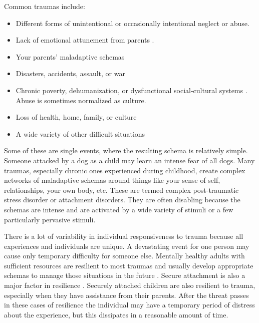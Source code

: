 \documentclass[12pt,letterpaper]{book}
\begin{document}
Common traumas include:
\begin{itemize}
    \item Different forms of unintentional or occasionally intentional neglect or abuse.
    \item Lack of emotional attunement from parents \cite{brownAttachmentDisturbances}.
    \item Your parents' maladaptive schemas
    \item Disasters, accidents, assault, or war
    \item Chronic poverty, dehumanization, or dysfunctional social-cultural systems \cite{roncaStructuralViolence}. Abuse is sometimes normalized as culture.
    \item Loss of health, home, family, or culture
    \item A wide variety of other difficult situations
\end{itemize}
Some of these are single events, where the resulting schema is relatively simple. Someone attacked by a dog as a child may learn an intense fear of all dogs. Many traumas, especially chronic ones experienced during childhood, create complex networks of maladaptive schemas around things like your sense of self, relationships, your own body, etc. These are termed complex post-traumatic stress disorder or attachment disorders. They are often disabling because the schemas are intense and are activated by a wide variety of stimuli or a few particularly pervasive stimuli.

There is a lot of variability in individual responsiveness to trauma because all experiences and individuals are unique. A devastating event for one person may cause only temporary difficulty for someone else. Mentally healthy adults with sufficient resources are resilient to most traumas and usually develop appropriate schemas to manage those situations in the future \cite{bonanno2008loss}. Secure attachment is also a major factor in resilience \cite{attachmentPTSD}. Securely attached children are also resilient to trauma, especially when they have assistance from their parents. After the threat passes in these cases of resilience the individual may have a temporary period of distress about the experience, but this dissipates in a reasonable amount of time.
\end{document}
